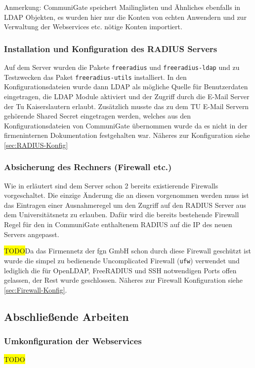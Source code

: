 \documentclass[11pt,a4paper,titlepage=firstiscover]{scrartcl} %
\newcommand{\hilight}[1]{\colorbox{yellow}{#1}} %
\begin{document}
Anmerkung: CommuniGate speichert Mailinglisten und Ähnliches ebenfalls in LDAP Objekten, es wurden hier nur die Konten von echten Anwendern und zur Verwaltung der Webservices etc. nötige Konten importiert.

\subsubsection{Installation und Konfiguration des RADIUS Servers}\label{sec:RADIUS-Konf}
Auf dem Server wurden die Pakete \texttt{freeradius} und \texttt{freeradius-ldap} und zu Testzwecken das Paket \texttt{freeradius-utils} installiert. In den Konfigurationsdateien wurde dann LDAP als mögliche Quelle für Benutzerdaten eingetragen, die LDAP Module aktiviert und der Zugriff durch die E-Mail Server der Tu Kaiserslautern erlaubt. Zusätzlich musste das zu dem TU E-Mail Servern gehörende Shared Secret eingetragen werden, welches aus den Konfigurationsdateien von CommuniGate übernommen wurde da es nicht in der firmeninternen Dokumentation festgehalten war. Näheres zur Konfiguration siehe \autoref{sec:RADIUS-Konfig}

\subsubsection{Absicherung des Rechners (Firewall etc.)}
Wie in  erläutert sind dem Server schon 2 bereits existierende Firewalls vorgeschaltet. Die einzige Änderung die an diesen vorgenommen werden muss ist das Eintragen einer Ausnahmeregel um den Zugriff auf den RADIUS Server aus dem Universitätsnetz zu erlauben. Dafür wird die bereits bestehende Firewall Regel für den in CommuniGate enthaltenem RADIUS auf die IP des neuen Servers angepasst.

\hilight{TODO}Da das Firmennetz der fgn GmbH schon durch diese Firewall geschützt ist wurde die simpel zu bedienende Uncomplicated Firewall (\texttt{ufw}) verwendet und lediglich die für OpenLDAP, FreeRADIUS und SSH notwendigen Ports offen gelassen, der Rest wurde geschlossen. Näheres zur Firewall Konfiguration siehe \autoref{sec:Firewall-Konfig}.

\subsection{Abschlie\ss{}ende Arbeiten}
\subsubsection{Umkonfiguration der Webservices}
\hilight{TODO}
\end{document}
